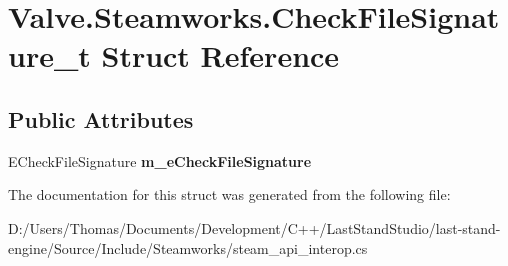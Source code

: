 \hypertarget{structValve_1_1Steamworks_1_1CheckFileSignature__t}{}\section{Valve.\+Steamworks.\+Check\+File\+Signature\+\_\+t Struct Reference}
\label{structValve_1_1Steamworks_1_1CheckFileSignature__t}
\subsection*{Public Attributes}
\begin{DoxyCompactItemize}
\item 
\hypertarget{structValve_1_1Steamworks_1_1CheckFileSignature__t_a5e2a5e6d9d5539e16b39bebc5a156fd3}{}E\+Check\+File\+Signature {\bfseries m\+\_\+e\+Check\+File\+Signature}\label{structValve_1_1Steamworks_1_1CheckFileSignature__t_a5e2a5e6d9d5539e16b39bebc5a156fd3}

\end{DoxyCompactItemize}


The documentation for this struct was generated from the following file\+:\begin{DoxyCompactItemize}
\item 
D\+:/\+Users/\+Thomas/\+Documents/\+Development/\+C++/\+Last\+Stand\+Studio/last-\/stand-\/engine/\+Source/\+Include/\+Steamworks/steam\+\_\+api\+\_\+interop.\+cs\end{DoxyCompactItemize}
